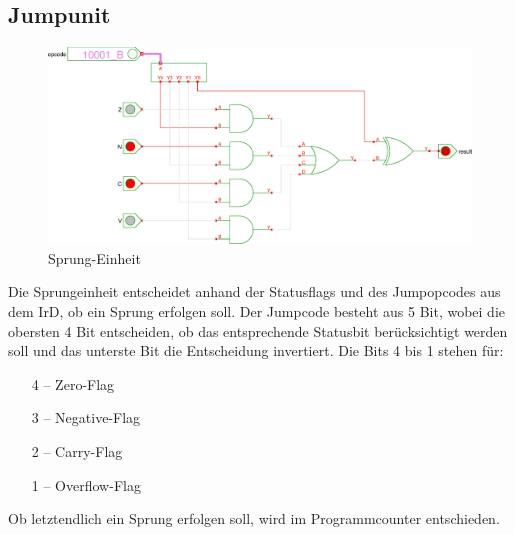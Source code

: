 \subsection{Jumpunit}
\begin{figure}[!ht]
\centering
\includegraphics[width=1\textwidth]{images/ju.eps}
\caption{\label{HW:JU}Sprung-Einheit}
\end{figure}
Die Sprungeinheit entscheidet anhand der Statusflags und des Jumpopcodes aus dem IrD, ob ein Sprung erfolgen soll. Der Jumpcode besteht aus 5 Bit, wobei die obersten 4 Bit entscheiden, ob das entsprechende Statusbit berücksichtigt werden soll und das unterste Bit die Entscheidung invertiert. Die Bits 4 bis 1 stehen für:
\begin{enumerate}
 \item[4] -- Zero-Flag
 \item[3] -- Negative-Flag
 \item[2] -- Carry-Flag
 \item[1] -- Overflow-Flag
\end{enumerate}
Ob letztendlich ein Sprung erfolgen soll, wird im Programmcounter entschieden.
